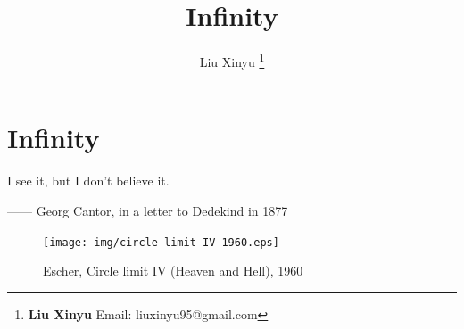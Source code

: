 \documentclass{article}
\begin{document}
\title{Infinity}

\author{Liu Xinyu
\thanks{{\bfseries Liu Xinyu} \newline
  Email: liuxinyu95@gmail.com \newline}
  }

\maketitle
\fi


\ifx\wholebook\relax
\chapter{Infinity}
\fi

\epigraph{I see it, but I don't believe it.}{ —— Georg Cantor, in a letter to Dedekind in 1877}


\begin{figure}
 \centering
 \texttt{[image: img/circle-limit-IV-1960.eps]}
 \captionsetup{labelformat=empty}
 \caption{Escher, Circle limit IV (Heaven and Hell), 1960}
 \label{fig:Circle-Limit-IV}
\end{figure}
\end{document}
